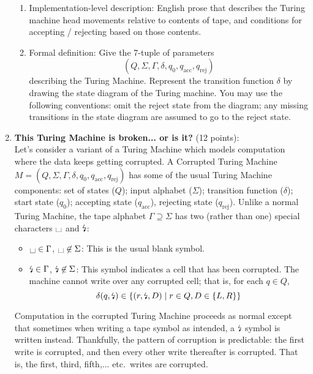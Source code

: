 \begin{enumerate}
\begin{enumerate}
\item\gradeCorrectFirst Implementation-level description: English prose that 
describes the Turing machine head movements relative to contents of tape, 
and conditions for accepting / rejecting based on those contents.

\item\gradeCorrect Formal definition: Give the 7-tuple of parameters 
$$(Q, \Sigma, \Gamma, \delta, q_0, q_{\mathrm{acc}}, q_{\mathrm{rej}})$$ 
describing the Turing Machine. Represent the transition 
function $\delta$ by drawing the
state diagram of the Turing machine. You may use the following 
conventions: omit the reject state from the diagram; any missing 
transitions in the state diagram are assumed to go to the reject state.

\end{enumerate}


\item \textbf{This Turing Machine is broken... or is it?} 
(12 points): \\
Let's consider a variant of a Turing Machine which models computation 
where the data keeps getting corrupted. A Corrupted Turing Machine $M = 
(Q, \Sigma, \Gamma, \delta, q_0, q_{\mathrm{acc}}, q_{\mathrm{rej}})$ has 
some of the usual Turing Machine components: set of states ($Q$); input 
alphabet ($\Sigma$); transition function ($\delta$); start state ($q_0$); 
accepting state ($q_{\mathrm{acc}}$), rejecting state 
($q_{\mathrm{rej}}$). Unlike a normal Turing Machine, the tape alphabet 
$\Gamma  \supseteq \Sigma$ has two (rather than one) special characters $\blank$ and $\text{\lightning}$:
\begin{itemize}
\item $\blank \in \Gamma$, $\blank \not\in \Sigma$: This is the usual blank symbol. 
\item $\text{\lightning} \in \Gamma$, $\text{\lightning} \not\in \Sigma$: This symbol indicates a cell that 
has been corrupted. The machine cannot write over any corrupted cell; that is, for each $q \in Q$,
\[
\delta(q, \text{\lightning}) \in \{ (r, \text{\lightning}, D) \mid r \in Q, D \in \{L, R\} \}
\]
\end{itemize} 

Computation in the corrupted Turing Machine proceeds as normal except that sometimes when 
writing a tape symbol as intended, a $\text{\lightning}$ symbol is written instead. Thankfully, 
the pattern of corruption is predictable: the first write is corrupted, and then every 
other write thereafter is corrupted. That is, the first, third, fifth,... etc.\ writes are corrupted.


\end{enumerate}
